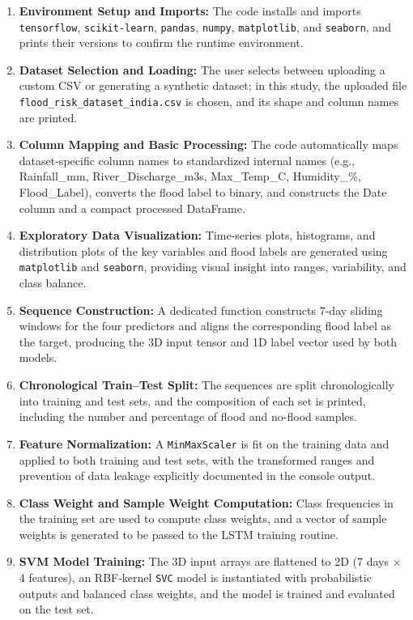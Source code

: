 \documentclass[conference]{IEEEtran}
\begin{document}
\begin{enumerate}
    \item \textbf{Environment Setup and Imports:} The code installs and imports \texttt{tensorflow}, \texttt{scikit-learn}, \texttt{pandas}, \texttt{numpy}, \texttt{matplotlib}, and \texttt{seaborn}, and prints their versions to confirm the runtime environment.
    \item \textbf{Dataset Selection and Loading:} The user selects between uploading a custom CSV or generating a synthetic dataset; in this study, the uploaded file \texttt{flood\_risk\_dataset\_india.csv} is chosen, and its shape and column names are printed.
    \item \textbf{Column Mapping and Basic Processing:} The code automatically maps dataset-specific column names to standardized internal names (e.g., Rainfall\_mm, River\_Discharge\_m3s, Max\_Temp\_C, Humidity\_\%, Flood\_Label), converts the flood label to binary, and constructs the Date column and a compact processed DataFrame.
    \item \textbf{Exploratory Data Visualization:} Time-series plots, histograms, and distribution plots of the key variables and flood labels are generated using \texttt{matplotlib} and \texttt{seaborn}, providing visual insight into ranges, variability, and class balance.
    \item \textbf{Sequence Construction:} A dedicated function constructs 7-day sliding windows for the four predictors and aligns the corresponding flood label as the target, producing the 3D input tensor and 1D label vector used by both models.
    \item \textbf{Chronological Train--Test Split:} The sequences are split chronologically into training and test sets, and the composition of each set is printed, including the number and percentage of flood and no-flood samples.
    \item \textbf{Feature Normalization:} A \texttt{MinMaxScaler} is fit on the training data and applied to both training and test sets, with the transformed ranges and prevention of data leakage explicitly documented in the console output.
    \item \textbf{Class Weight and Sample Weight Computation:} Class frequencies in the training set are used to compute class weights, and a vector of sample weights is generated to be passed to the LSTM training routine.
    \item \textbf{SVM Model Training:} The 3D input arrays are flattened to 2D (7 days \(\times\) 4 features), an RBF-kernel \texttt{SVC} model is instantiated with probabilistic outputs and balanced class weights, and the model is trained and evaluated on the test set.

\end{enumerate}
\end{document}
